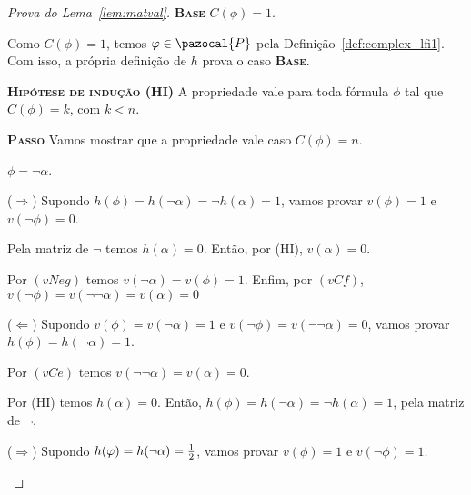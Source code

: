 \begin{proof}[Prova do Lema~\ref{lem:matval}]
        \noindent \textbf{\textsc{Base}} $C(\phi) = 1$.

        Como $C(\phi) = 1$, temos $\phi \in \pazocal{P}$ pela Definição~\ref{def:complex_lfi1}. Com isso, a própria definição de $h$ prova o caso \textbf{\textsc{Base}}.

        \noindent \textbf{\textsc{Hipótese de indução (HI)}} 
        A propriedade vale para toda fórmula $\phi$ tal que $C(\phi) = k$, com $k < n$.

        \noindent \textbf{\textsc{Passo}} 
            Vamos mostrar que a propriedade vale caso $C(\phi) = n$.

        \begin{provaporcasos}
            \casodeprova{} $\phi = \neg \alpha$.
                
                \begin{provaporsubcasos}
                        
                        ($\Longrightarrow$) Supondo $h(\phi) = h(\neg \alpha) = \neg h(\alpha) = 1$, vamos provar $v(\phi) = 1$ e $v(\neg \phi) = 0$. 
                        
                        Pela matriz de $\neg$ temos $h(\alpha) = 0$. Então, por (HI), $v(\alpha) = 0$. 
                        
                        Por $(vNeg)$ temos $v(\neg \alpha) = v(\phi) = 1$. Enfim, por $(vCf)$, $v(\neg \phi) = v(\neg \neg \alpha) = v(\alpha) = 0$
                        
                        
                        ($\Longleftarrow$) Supondo $v(\phi) = v(\neg \alpha) = 1$ e $v(\neg \phi) = v(\neg \neg \alpha) = 0$, vamos provar $h(\phi) = h(\neg \alpha) = 1$.
                        
                        Por $(vCe)$ temos $v(\neg \neg \alpha) = v(\alpha) = 0$.
                        
                        Por (HI) temos $h(\alpha) = 0$. Então, $h(\phi) = h(\neg \alpha) = \neg h(\alpha) = 1$, pela matriz de $\neg$.
                    
                    
                        ($\Longrightarrow$) Supondo $h(\varphi) = h(\neg \alpha) = \frac{1}{2}{}$, vamos provar $v(\phi) = 1$ e $v(\neg \phi) = 1$.
                        

\end{provaporsubcasos}
\end{provaporcasos}
\end{proof}
